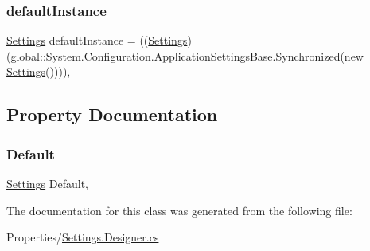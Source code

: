 \subsubsection{\texorpdfstring{default\+Instance}{defaultInstance}}
{\footnotesize\ttfamily \hyperlink{classWildlifeTrackingApp_1_1Properties_1_1Settings}{Settings} default\+Instance = ((\hyperlink{classWildlifeTrackingApp_1_1Properties_1_1Settings}{Settings})(global\+::\+System.\+Configuration.\+Application\+Settings\+Base.\+Synchronized(new \hyperlink{classWildlifeTrackingApp_1_1Properties_1_1Settings}{Settings}())))\hspace{0.3cm}{\ttfamily [static]}, {\ttfamily [private]}}



\subsection{Property Documentation}
\mbox{\label{classWildlifeTrackingApp_1_1Properties_1_1Settings_af44ce680f893da1cfe4575b306835697}} 
\subsubsection{\texorpdfstring{Default}{Default}}
{\footnotesize\ttfamily \hyperlink{classWildlifeTrackingApp_1_1Properties_1_1Settings}{Settings} Default\hspace{0.3cm}{\ttfamily [static]}, {\ttfamily [get]}}



The documentation for this class was generated from the following file\+:\begin{DoxyCompactItemize}
\item 
Properties/\hyperlink{Settings_8Designer_8cs}{Settings.\+Designer.\+cs}\end{DoxyCompactItemize}

